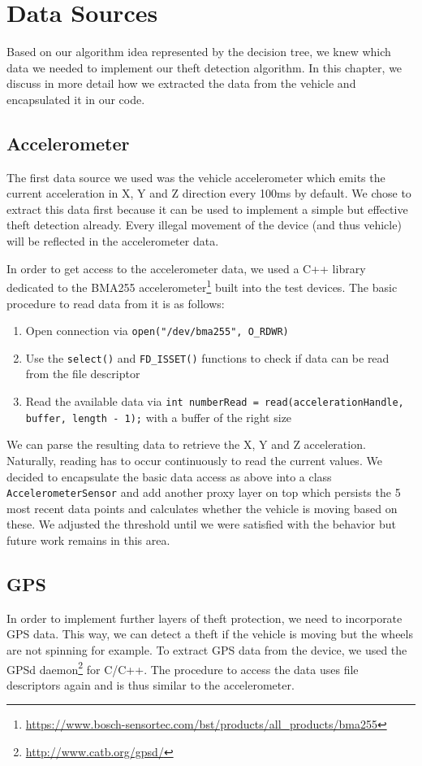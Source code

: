\section{Data Sources}

Based on our algorithm idea represented by the decision tree, we knew which data we needed to implement our theft detection algorithm. In this chapter, we discuss in more detail how we extracted the data from the vehicle and encapsulated it in our code.

\subsection{Accelerometer}
The first data source we used was the vehicle accelerometer which emits the current acceleration in X, Y and Z direction every 100ms by default. We chose to extract this data first because it can be used to implement a simple but effective theft detection already. Every illegal movement of the device (and thus vehicle) will be reflected in the accelerometer data.

In order to get access to the accelerometer data, we used a C++ library dedicated to the BMA255 accelerometer\footnote{\url{https://www.bosch-sensortec.com/bst/products/all_products/bma255}} built into the test devices. The basic procedure to read data from it is as follows:

\begin{enumerate}
	\item Open connection via \texttt{open("/dev/bma255", O\_RDWR)}
	\item Use the \texttt{select()} and \texttt{FD\_ISSET()} functions to check if data can be read from the file descriptor
	\item Read the available data via \texttt{int numberRead = read(accelerationHandle, buffer, length - 1);} with a buffer of the right size
\end{enumerate}

We can parse the resulting data to retrieve the X, Y and Z acceleration. Naturally, reading has to occur continuously to read the current values. We decided to encapsulate the basic data access as above into a class \texttt{AccelerometerSensor} and add another proxy layer on top which persists the 5 most recent data points and calculates whether the vehicle is moving based on these. We adjusted the threshold until we were satisfied with the behavior but future work remains in this area.

\subsection{GPS}
In order to implement further layers of theft protection, we need to incorporate GPS data. This way, we can detect a theft if the vehicle is moving but the wheels are not spinning for example. To extract GPS data from the device, we used the GPSd daemon\footnote{\url{http://www.catb.org/gpsd/}} for C/C++. The procedure to access the data uses file descriptors again and is thus similar to the accelerometer.

